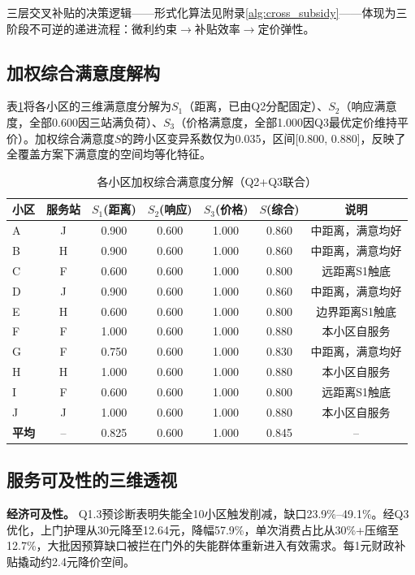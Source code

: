 三层交叉补贴的决策逻辑——形式化算法见附录\ref{alg:cross_subsidy}——体现为三阶段不可逆的递进流程：微利约束$\to$补贴效率$\to$定价弹性。

\subsection{加权综合满意度解构}

表\ref{tab:q3_satisfaction}将各小区的三维满意度分解为$S_1$（距离，已由Q2分配固定）、$S_2$（响应满意度，全部0.600因三站满负荷）、$S_3$（价格满意度，全部1.000因Q3最优定价维持平价）。加权综合满意度$S$的跨小区变异系数仅为0.035，区间[0.800, 0.880]，反映了全覆盖方案下满意度的空间均等化特征。

\begin{table}[htbp]
\centering
\caption{各小区加权综合满意度分解（Q2+Q3联合）}
\label{tab:q3_satisfaction}
\begin{tabular}{lcccccc}
\toprule
\textbf{小区} & \textbf{服务站} & $S_1$(距离) & $S_2$(响应) & $S_3$(价格) & $S$(综合) & \textbf{说明} \\
\midrule
A & J & 0.900 & 0.600 & 1.000 & 0.860 & 中距离，满意均好 \\
B & H & 0.900 & 0.600 & 1.000 & 0.860 & 中距离，满意均好 \\
C & F & 0.600 & 0.600 & 1.000 & 0.800 & 远距离S1触底 \\
D & J & 0.900 & 0.600 & 1.000 & 0.860 & 中距离，满意均好 \\
E & H & 0.600 & 0.600 & 1.000 & 0.800 & 边界距离S1触底 \\
F & F & 1.000 & 0.600 & 1.000 & 0.880 & 本小区自服务 \\
G & F & 0.750 & 0.600 & 1.000 & 0.830 & 中距离，满意均好 \\
H & H & 1.000 & 0.600 & 1.000 & 0.880 & 本小区自服务 \\
I & F & 0.600 & 0.600 & 1.000 & 0.800 & 远距离S1触底 \\
J & J & 1.000 & 0.600 & 1.000 & 0.880 & 本小区自服务 \\
\midrule
\textbf{平均} & -- & 0.825 & 0.600 & 1.000 & 0.845 & -- \\
\bottomrule
\end{tabular}
\end{table}

\subsection{服务可及性的三维透视}

\textbf{经济可及性。} Q1.3预诊断表明失能全10小区触发削减，缺口23.9\%--49.1\%。经Q3优化，上门护理从30元降至12.64元，降幅57.9\%，单次消费占比从30\%+压缩至12.7\%，大批因预算缺口被拦在门外的失能群体重新进入有效需求。每1元财政补贴撬动约2.4元降价空间。

